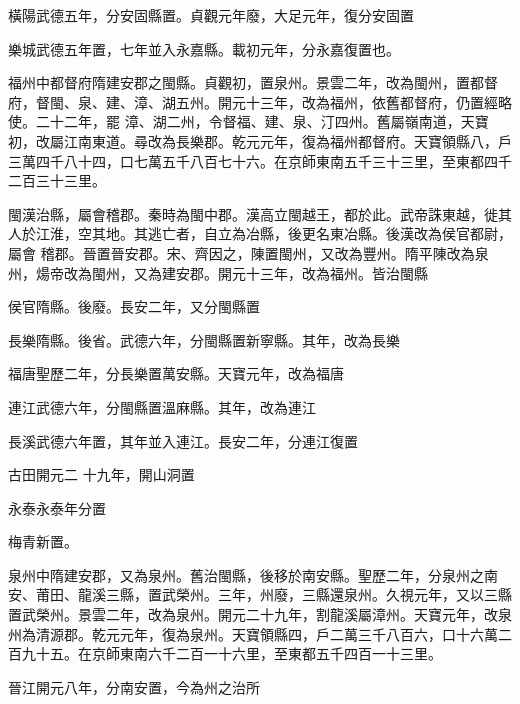 \begin{pinyinscope}
 橫陽武德五年，分安固縣置。貞觀元年廢，大足元年，復分安固置



 樂城武德五年置，七年並入永嘉縣。載初元年，分永嘉復置也。



 福州中都督府隋建安郡之閩縣。貞觀初，置泉州。景雲二年，改為閩州，置都督府，督閩、泉、建、漳、湖五州。開元十三年，改為福州，依舊都督府，仍置經略使。二十二年，罷
 漳、湖二州，令督福、建、泉、汀四州。舊屬嶺南道，天寶初，改屬江南東道。尋改為長樂郡。乾元元年，復為福州都督府。天寶領縣八，戶三萬四千八十四，口七萬五千八百七十六。在京師東南五千三十三里，至東都四千二百三十三里。



 閩漢治縣，屬會稽郡。秦時為閩中郡。漢高立閩越王，都於此。武帝誅東越，徙其人於江淮，空其地。其逃亡者，自立為冶縣，後更名東冶縣。後漢改為侯官都尉，屬會
 稽郡。晉置晉安郡。宋、齊因之，陳置閩州，又改為豐州。隋平陳改為泉州，煬帝改為閩州，又為建安郡。開元十三年，改為福州。皆治閩縣



 侯官隋縣。後廢。長安二年，又分閩縣置



 長樂隋縣。後省。武德六年，分閩縣置新寧縣。其年，改為長樂



 福唐聖歷二年，分長樂置萬安縣。天寶元年，改為福唐



 連江武德六年，分閩縣置溫麻縣。其年，改為連江



 長溪武德六年置，其年並入連江。長安二年，分連江復置



 古田開元二
 十九年，開山洞置



 永泰永泰年分置



 梅青新置。



 泉州中隋建安郡，又為泉州。舊治閩縣，後移於南安縣。聖歷二年，分泉州之南安、莆田、龍溪三縣，置武榮州。三年，州廢，三縣還泉州。久視元年，又以三縣置武榮州。景雲二年，改為泉州。開元二十九年，割龍溪屬漳州。天寶元年，改泉州為清源郡。乾元元年，復為泉州。天寶領縣四，戶二萬三千八百六，口十六萬二
 百九十五。在京師東南六千二百一十六里，至東都五千四百一十三里。



 晉江開元八年，分南安置，今為州之治所




\end{pinyinscope}
